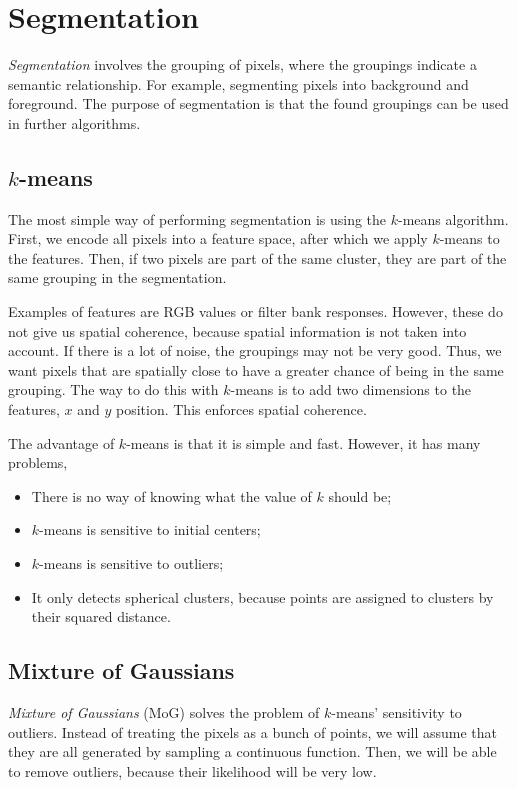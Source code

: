 \section{Segmentation}

\textit{Segmentation} involves the grouping of pixels, where the groupings
indicate a semantic relationship. For example, segmenting pixels into
background and foreground. The purpose of segmentation is that the found
groupings can be used in further algorithms.

\subsection{$k$-means}

The most simple way of performing segmentation is using the $k$-means
algorithm. First, we encode all pixels into a feature space, after which we
apply $k$-means to the features. Then, if two pixels are part of the same
cluster, they are part of the same grouping in the segmentation.

Examples of features are RGB values or filter bank responses. However, these do not give us spatial
coherence, because spatial information is not taken into account. If there is
a lot of noise, the groupings may not be very good. Thus, we want pixels that
are spatially close to have a greater chance of being in the same grouping.
The way to do this with $k$-means is to add two dimensions to the features,
$x$ and $y$ position. This enforces spatial coherence.

The advantage of $k$-means is that it is simple and fast. However, it has
many problems,
\begin{itemize}
  \item There is no way of knowing what the value of $k$ should be;
  \item $k$-means is sensitive to initial centers;
  \item $k$-means is sensitive to outliers;
  \item It only detects spherical clusters, because points are assigned to
    clusters by their squared distance.
\end{itemize}

\subsection{Mixture of Gaussians}

\textit{Mixture of Gaussians} (MoG) solves the problem of $k$-means'
sensitivity to outliers. Instead of treating the pixels as a bunch of points,
we will assume that they are all generated by sampling a continuous function.
Then, we will be able to remove outliers, because their likelihood will be very
low.

